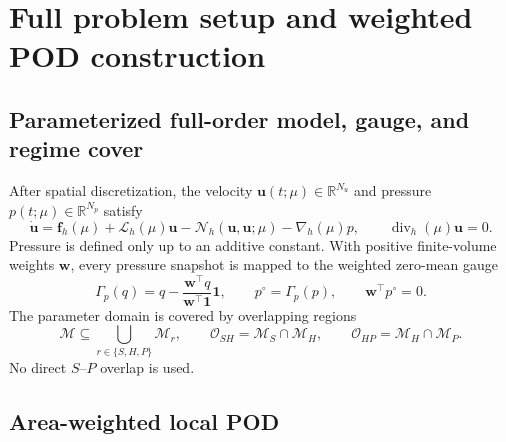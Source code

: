 \section{Full problem setup and weighted POD construction}
\label{app:problem_pod}

\subsection{Parameterized full-order model, gauge, and regime cover}

After spatial discretization, the velocity $\bm u(t;\mu)\in\mathbb R^{N_u}$ and pressure $p(t;\mu)\in\mathbb R^{N_p}$ satisfy
\begin{equation}
 \dot{\bm u}=\bm f_h(\mu)+\mathcal L_h(\mu)\bm u
 -\mathcal N_h(\bm u,\bm u;\mu)-\nabla_h(\mu)p,
 \qquad \operatorname{div}_h(\mu)\bm u=0.
 \label{eq:app_fom}
\end{equation}
Pressure is defined only up to an additive constant. With positive finite-volume weights $\bm w$, every pressure snapshot is mapped to the weighted zero-mean gauge
\begin{equation}
 \Gamma_p(q)=q-\frac{\bm w^\top q}{\bm w^\top\bm 1}\bm 1,
 \qquad p^\circ=\Gamma_p(p),
 \qquad \bm w^\top p^\circ=0.
 \label{eq:app_pressure_gauge}
\end{equation}
The parameter domain is covered by overlapping regions
\begin{equation}
 \mathcal M\subseteq\bigcup_{r\in\{S,H,P\}}\mathcal M_r,
 \qquad \mathcal O_{SH}=\mathcal M_S\cap\mathcal M_H,
 \qquad \mathcal O_{HP}=\mathcal M_H\cap\mathcal M_P.
 \label{eq:app_regime_cover}
\end{equation}
No direct $S$--$P$ overlap is used.

\subsection{Area-weighted local POD}

